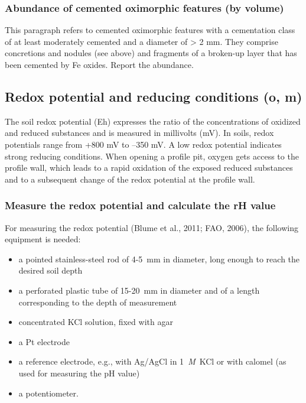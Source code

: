 \documentclass[
  letterpaper,
  DIV=11,
  numbers=noendperiod]{scrreprt}
\providecommand{\tightlist}{%
  \setlength{\itemsep}{0pt}\setlength{\parskip}{0pt}}\usepackage{longtable,booktabs,array}
\begin{document}
\hypertarget{abundance-of-cemented-oximorphic-features-by-volume}{%
\subsubsection{Abundance of cemented oximorphic features (by
volume)}\label{abundance-of-cemented-oximorphic-features-by-volume}}

This paragraph refers to cemented oximorphic features with a cementation
class of at least moderately cemented and a diameter of \textgreater{} 2
mm. They comprise concretions and nodules (see above) and fragments of a
broken-up layer that has been cemented by Fe oxides. Report the
abundance.

\hypertarget{redox-potential-and-reducing-conditions-o-m}{%
\subsection{Redox potential and reducing conditions (o,
m)}\label{redox-potential-and-reducing-conditions-o-m}}

The soil redox potential (Eh) expresses the ratio of the concentrations
of oxidized and reduced substances and is measured in millivolts (mV).
In soils, redox potentials range from +800 mV to --350 mV. A low redox
potential indicates strong reducing conditions. When opening a profile
pit, oxygen gets access to the profile wall, which leads to a rapid
oxidation of the exposed reduced substances and to a subsequent change
of the redox potential at the profile wall.

\hypertarget{measure-the-redox-potential-and-calculate-the-rh-value}{%
\subsubsection{Measure the redox potential and calculate the rH
value}\label{measure-the-redox-potential-and-calculate-the-rh-value}}

For measuring the redox potential (Blume et al., 2011; FAO, 2006), the
following equipment is needed:

\begin{itemize}
\tightlist
\item
  a pointed stainless-steel rod of 4-5~mm in diameter, long enough to
  reach the desired soil depth
\item
  a perforated plastic tube of 15-20~mm in diameter and of a length
  corresponding to the depth of measurement
\item
  concentrated KCl solution, fixed with agar
\item
  a Pt electrode
\item
  a reference electrode, e.g., with Ag/AgCl in 1~\emph{M}~KCl or with
  calomel (as used for measuring the pH value)
\item
  a potentiometer.
\end{itemize}
\end{document}
